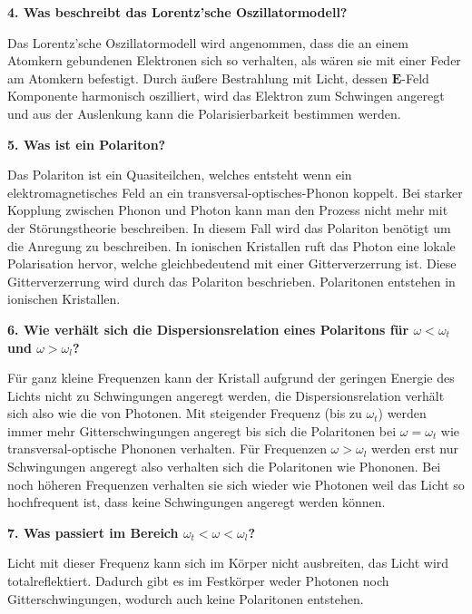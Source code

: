 \noindent\textbf{4. Was beschreibt das Lorentz'sche Oszillatormodell?}\\
\begin{addmargin}[25pt]{0pt}
    Das Lorentz'sche Oszillatormodell wird angenommen, dass die an einem Atomkern gebundenen Elektronen sich so verhalten, als wären sie mit einer Feder am Atomkern befestigt. Durch äußere Bestrahlung mit Licht, dessen $\mathbf{E}$-Feld Komponente harmonisch oszilliert, wird das Elektron zum Schwingen angeregt und aus der Auslenkung kann die Polarisierbarkeit bestimmen werden.  \\
\end{addmargin}

\noindent\textbf{5. Was ist ein Polariton?}\\
\begin{addmargin}[25pt]{0pt}
Das Polariton ist ein Quasiteilchen, welches entsteht wenn ein elektromagnetisches Feld an ein transversal-optisches-Phonon koppelt. Bei starker Kopplung zwischen Phonon und Photon kann man den Prozess nicht mehr mit der Störungstheorie beschreiben. In diesem Fall  wird das Polariton benötigt um die Anregung zu beschreiben. In ionischen Kristallen ruft das Photon eine lokale Polarisation hervor, welche gleichbedeutend mit einer Gitterverzerrung ist. Diese Gitterverzerrung wird durch das Polariton beschrieben. Polaritonen entstehen in ionischen Kristallen.\\
\end{addmargin}

\noindent\textbf{6. Wie verhält sich die Dispersionsrelation eines Polaritons für $\omega < \omega_t$ und $\omega > \omega_l$?}\\
\begin{addmargin}[25pt]{0pt}
Für ganz kleine Frequenzen kann der Kristall aufgrund der geringen Energie des Lichts nicht zu Schwingungen angeregt werden, die Dispersionsrelation verhält sich also wie die von Photonen. Mit steigender Frequenz (bis zu $\omega_t$) werden immer mehr Gitterschwingungen angeregt bis sich die Polaritonen bei $\omega = \omega_t$ wie transversal-optische Phononen verhalten. Für Frequenzen $\omega >\omega_l$ werden erst nur Schwingungen angeregt also verhalten sich die Polaritonen wie Phononen. Bei noch höheren Frequenzen verhalten sie sich wieder wie Photonen weil das Licht so hochfrequent ist, dass keine Schwingungen angeregt werden können.   \\
\end{addmargin}

\noindent\textbf{7. Was passiert im Bereich $\omega_t < \omega < \omega_l$?}\\
\begin{addmargin}[25pt]{0pt}
Licht mit dieser Frequenz kann sich im Körper nicht ausbreiten, das Licht wird totalreflektiert. Dadurch gibt es im Festkörper weder Photonen noch Gitterschwingungen, wodurch auch keine Polaritonen entstehen.\\
\end{addmargin}

